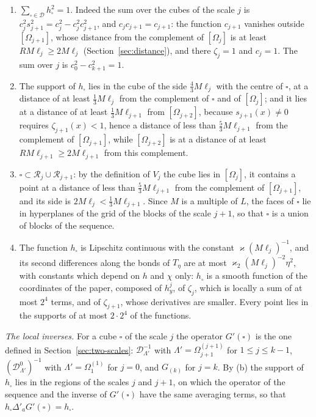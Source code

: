\documentclass[11pt]{preprint}
\numberwithin{equation}{section}
\theoremstyle{definition}
\theoremstyle{remark}
\theoremstyle{plain}
\begin{document}
\begin{enumerate}[label=(\alph*)]
\item $\sum_{\square \in \mathscr D}h_\square^2 = 1$. Indeed the sum over the cubes of the scale $j$ is $c_j^2s_{j+1}^2 = c_j^2 - c_j^2c_{j+1}^2$, and $c_jc_{j+1} = c_{j+1}$: the function $c_{j+1}$ vanishes outside $[\Omega_{j+1}]$, whose distance from the complement of $[\Omega_j]$ is at least $RM\ell_j \geq 2M\ell_j$ (Section~\ref{sec:distance}), and there $\zeta_j = 1$ and $c_j = 1$. The sum over $j$ is $c_0^2 - c_{k+1}^2 = 1$.
\item The support of $h_\square$ lies in the cube of the side $\frac43M\ell_j$ with the centre of $\square$, at a distance of at least $\frac13M\ell_j$ from the complement of $\square$ and of $[\Omega_j]$; and it lies at a distance of at least $\frac13M\ell_{j+1}$ from $[\Omega_{j+2}]$, because $s_{j+1}(x) \neq 0$ requires $\zeta_{j+1}(x) < 1$, hence a distance of less than $\frac53M\ell_{j+1}$ from the complement of $[\Omega_{j+1}]$, while $[\Omega_{j+2}]$ is at a distance of at least $RM\ell_{j+1} \geq 2M\ell_{j+1}$ from this complement.
\item $\square \subset \mathcal R_j \cup \mathcal R_{j+1}$: by the definition of $V_j$ the cube lies in $[\Omega_j]$, it contains a point at a distance of less than $\frac53M\ell_{j+1}$ from the complement of $[\Omega_{j+1}]$, and its side is $2M\ell_j < \frac13M\ell_{j+1}$. Since $M$ is a multiple of $L$, the faces of $\square$ lie in hyperplanes of the grid of the blocks of the scale $j + 1$, so that $\square$ is a union of blocks of the sequence.
\item The function $h_\square$ is Lipschitz continuous with the constant $\varkappa(M\ell_j)^{-1}$, and its second differences along the bonds of $T_\eta$ are at most $\varkappa_2(M\ell_j)^{-2}\eta^2$, with constants which depend on $h$ and $\chi$ only: $h_\square$ is a smooth function of the coordinates of the paper, composed of $h^j_y$, of $\zeta_j$, which is locally a sum of at most $2^4$ terms, and of $\zeta_{j+1}$, whose derivatives are smaller. Every point lies in the supports of at most $2 \cdot 2^4$ of the functions.
\end{enumerate}

\emph{The local inverses.} For a cube $\square$ of the scale $j$ the operator $G'(\square)$ is the one defined in Section~\ref{sec:two-scales}: $\mathcal D_{\Lambda'}^{-1}$ with $\Lambda' = \Omega^{(j+1)}_{j+1}$ for $1 \leq j \leq k - 1$, $(\mathcal D^0_{\Lambda'})^{-1}$ with $\Lambda' = \Omega^{(1)}_1$ for $j = 0$, and $G_{(k)}$ for $j = k$. By (b) the support of $h_\square$ lies in the regions of the scales $j$ and $j + 1$, on which the operator of the sequence and the inverse of $G'(\square)$ have the same averaging terms, so that $h_\square\Delta'_aG'(\square) = h_\square$.
\end{document}
